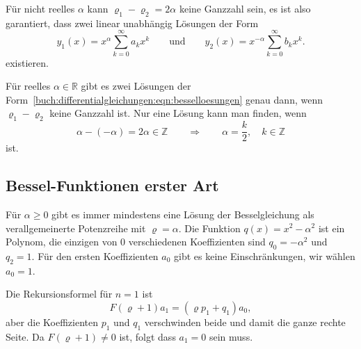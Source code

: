 Für nicht reelles $\alpha$ kann $\varrho_1-\varrho_2=2\alpha$ keine 
Ganzzahl sein, es ist also garantiert, dass zwei linear unabhängig
Lösungen der Form
\begin{equation}
y_1(x) = x^\alpha\sum_{k=0}^\infty a_kx^k
\qquad\text{und}\qquad
y_2(x) = x^{-\alpha}\sum_{k=0}^\infty b_kx^k.
\label{buch:differentialgleichungen:eqn:besselloesungen}
\end{equation}
existieren.

Für reelles $\alpha\in\mathbb{R}$ gibt es zwei Lösungen der
Form~\eqref{buch:differentialgleichungen:eqn:besselloesungen}
genau dann, wenn $\varrho_1-\varrho_2$ keine Ganzzahl ist.
Nur eine Lösung kann man finden, wenn 
\[
\alpha-(-\alpha)=2\alpha \in \mathbb{Z}
\qquad\Rightarrow\qquad
\alpha = \frac{k}{2},\quad k\in\mathbb{Z}
\]
ist.



\subsection{Bessel-Funktionen erster Art}
Für $\alpha \ge 0$ gibt es immer mindestens eine Lösung der Besselgleichung
als verallgemeinerte Potenzreihe mit $\varrho=\alpha$.
Die Funktion $q(x)=x^2-\alpha^2$ ist ein Polynom, die einzigen
von $0$ verschiedenen Koeffizienten sind $q_0=-\alpha^2$
und $q_2=1$.
Für den ersten Koeffizienten $a_0$ gibt es keine Einschränkungen,
wir wählen $a_0=1$.

Die Rekursionsformel für $n=1$ ist
\[
F(\varrho+1) a_1 = (\varrho p_1+q_1)a_0,
\]
aber die Koeffizienten $p_1$ und $q_1$ verschwinden beide und damit
die ganze rechte Seite.
Da $F(\varrho+1)\ne 0$ ist, folgt dass $a_1=0$ sein muss.


